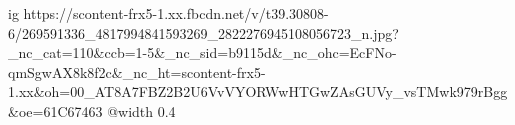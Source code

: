  
 
 
 
 

\ifcmt
  ig https://scontent-frx5-1.xx.fbcdn.net/v/t39.30808-6/269591336_4817994841593269_2822276945108056723_n.jpg?_nc_cat=110&ccb=1-5&_nc_sid=b9115d&_nc_ohc=EcFNo-qmSgwAX8k8f2c&_nc_ht=scontent-frx5-1.xx&oh=00_AT8A7FBZ2B2U6VvVYORWwHTGwZAsGUVy_vsTMwk979rBgg&oe=61C67463
  @width 0.4
\fi
